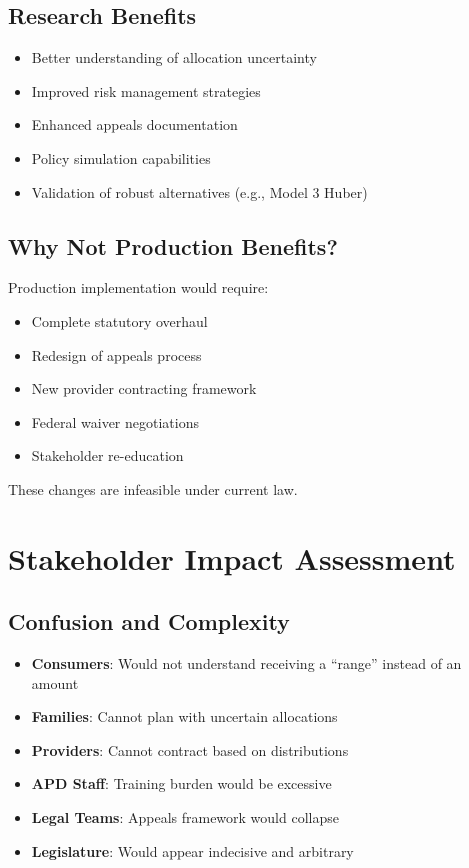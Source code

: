 \subsection{Research Benefits}

\begin{itemize}
    \item Better understanding of allocation uncertainty
    \item Improved risk management strategies
    \item Enhanced appeals documentation
    \item Policy simulation capabilities
    \item Validation of robust alternatives (e.g., Model 3 Huber)
\end{itemize}

\subsection{Why Not Production Benefits?}

Production implementation would require:
\begin{itemize}
    \item Complete statutory overhaul
    \item Redesign of appeals process
    \item New provider contracting framework
    \item Federal waiver negotiations
    \item Stakeholder re-education
\end{itemize}

These changes are infeasible under current law.

\section{Stakeholder Impact Assessment}

\subsection{Confusion and Complexity}

\begin{itemize}
    \item \textbf{Consumers}: Would not understand receiving a ``range'' instead of an amount
    \item \textbf{Families}: Cannot plan with uncertain allocations
    \item \textbf{Providers}: Cannot contract based on distributions
    \item \textbf{APD Staff}: Training burden would be excessive
    \item \textbf{Legal Teams}: Appeals framework would collapse
    \item \textbf{Legislature}: Would appear indecisive and arbitrary
\end{itemize}

